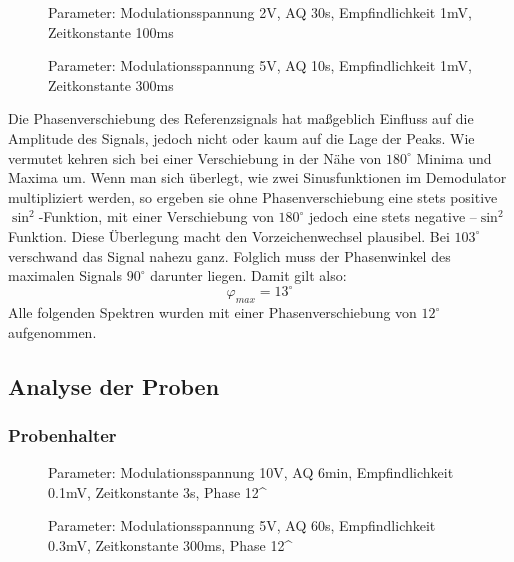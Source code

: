 		\begin{figure}[H]
			\center
			
			\caption{\centering Parameter: Modulationsspannung 2V, AQ 30s, Empfindlichkeit 1mV, Zeitkonstante 100ms}
		\end{figure}

		\begin{figure}[H]
			\center
			
			\caption{\centering Parameter: Modulationsspannung 5V, AQ 10s, Empfindlichkeit 1mV, Zeitkonstante 300ms}
		\end{figure}

		Die Phasenverschiebung des Referenzsignals hat maßgeblich Einfluss auf die Amplitude des Signals, jedoch nicht oder kaum auf die Lage der Peaks. 
		Wie vermutet kehren sich bei einer Verschiebung in der Nähe von $180^\circ$ Minima und Maxima um. 
		Wenn man sich überlegt, wie zwei Sinusfunktionen im Demodulator multipliziert werden, so ergeben sie ohne Phasenverschiebung eine stets positive $\sin^2$-Funktion, mit einer Verschiebung von $180^\circ$ jedoch eine stets negative $–\sin^2$ Funktion. 
		Diese Überlegung macht den Vorzeichenwechsel plausibel. 
		Bei $103^\circ$ verschwand das Signal nahezu ganz. 
		Folglich muss der Phasenwinkel des maximalen Signals $90^\circ$ darunter liegen.
		Damit gilt also:
		\[
			\varphi_{max} = 13^\circ 
		\]
		Alle folgenden Spektren wurden mit einer Phasenverschiebung von $12^\circ$ aufgenommen.



\subsection{Analyse der Proben} %
\label{sub:qualitative_analyse_der_proben}

	\subsubsection{Probenhalter} %
	\label{ssub:probenhalter}
	
		\begin{figure}[H]
			\center
			
			\caption{\centering Parameter: Modulationsspannung 10V, AQ 6min, Empfindlichkeit 0.1mV, Zeitkonstante 3s, Phase 12^\circ}
		\end{figure}

		\begin{figure}[H]
			\center
			
			\caption{\centering Parameter: Modulationsspannung 5V, AQ 60s, Empfindlichkeit 0.3mV, Zeitkonstante 300ms, Phase 12^\circ}
		\end{figure}

